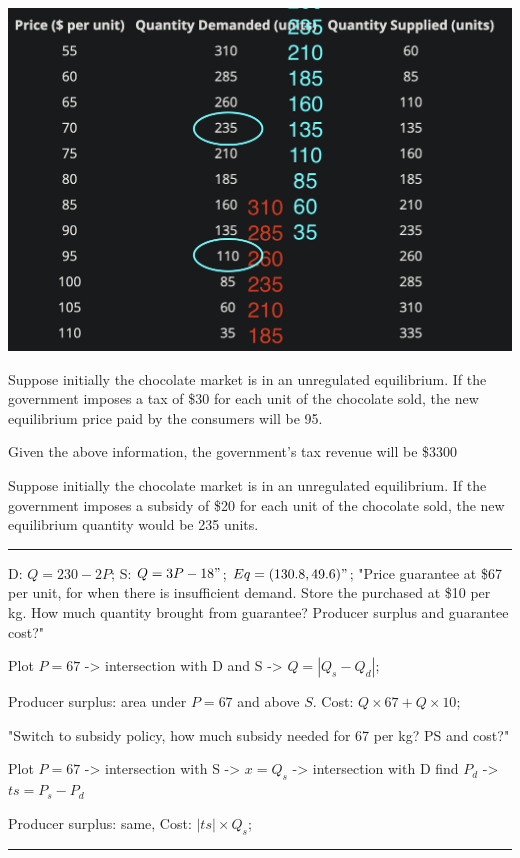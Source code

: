 \documentclass[a4paper]{article}
\begin{document}
\begin{multicols*}{3}
        \includegraphics[width=\linewidth]{./ts-table.png}

        Suppose initially the chocolate market is in an unregulated equilibrium. If the government imposes a tax of \$30 for each unit of the chocolate sold, the new equilibrium price paid by the consumers will be 95.

        Given the above information, the government’s tax revenue will be \$3300

        Suppose initially the chocolate market is in an unregulated equilibrium. If the government imposes a subsidy of \$20 for each unit of the chocolate sold, the new equilibrium quantity would be 235 units.

        \rule{1\linewidth}{0.4pt}

        D: $Q=230-2P$; S: $Q=3P-18"$; $Eq = (130.8,49.6)"$; "Price guarantee at \$67 per unit, for when there is insufficient demand. Store the purchased at \$10 per kg. How much quantity brought from guarantee? Producer surplus and guarantee cost?"

        Plot $P=67$ -> intersection with D and S -> $Q=|Q_s-Q_d|$;

        Producer surplus: area under $P=67$ and above $S$. Cost: $Q \times 67 + Q \times 10$;

        "Switch to subsidy policy, how much subsidy needed for 67 per kg? PS and cost?"

        Plot $P=67$ -> intersection with S -> $x=Q_s$ -> intersection with D find $P_d$ -> $ts = P_s - P_d$

        Producer surplus: same, Cost: $|ts| \times Q_s$;

        \rule{1\linewidth}{0.4pt}


\end{multicols*}
\end{document}
